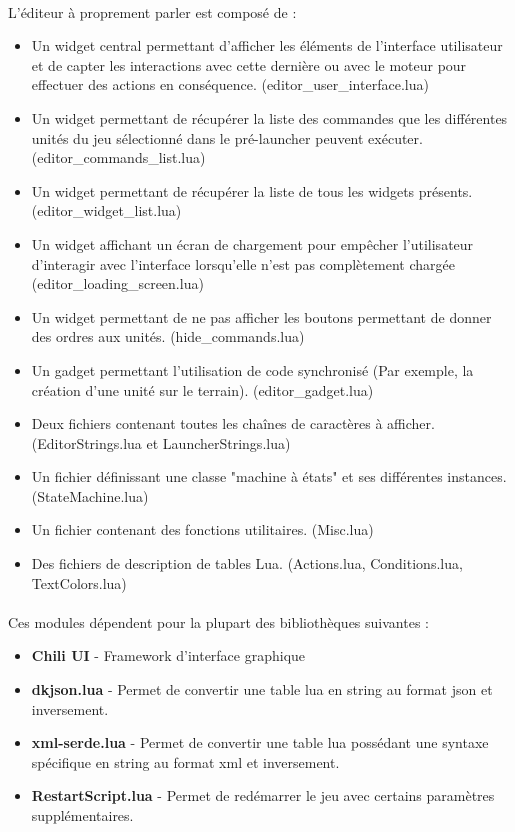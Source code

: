 \documentclass[a4paper]{article}
\begin{document}
\paragraph{}
L'éditeur à proprement parler est composé de :
\begin{itemize}
\item Un widget central permettant d'afficher les éléments de l'interface utilisateur et de capter les interactions avec cette dernière ou avec le moteur pour effectuer des actions en conséquence. (editor\_user\_interface.lua)
\item Un widget permettant de récupérer la liste des commandes que les différentes unités du jeu sélectionné dans le pré-launcher peuvent exécuter. (editor\_commands\_list.lua)
\item Un widget permettant de récupérer la liste de tous les widgets présents. (editor\_widget\_list.lua)
\item Un widget affichant un écran de chargement pour empêcher l'utilisateur d'interagir avec l'interface lorsqu'elle n'est pas complètement chargée (editor\_loading\_screen.lua)
\item Un widget permettant de ne pas afficher les boutons permettant de donner des ordres aux unités. (hide\_commands.lua)
\item Un gadget permettant l'utilisation de code synchronisé (Par exemple, la création d'une unité sur le terrain). (editor\_gadget.lua)
\item Deux fichiers contenant toutes les chaînes de caractères à afficher. (EditorStrings.lua et LauncherStrings.lua)
\item Un fichier définissant une classe "machine à états" et ses différentes instances. (StateMachine.lua)
\item Un fichier contenant des fonctions utilitaires. (Misc.lua)
\item Des fichiers de description de tables Lua. (Actions.lua, Conditions.lua, TextColors.lua)
\end{itemize}
\paragraph{}
Ces modules dépendent pour la plupart des bibliothèques suivantes :
\begin{itemize}
\item \textbf{Chili UI} - Framework d'interface graphique
\item \textbf{dkjson.lua} - Permet de convertir une table lua en string au format json et inversement.
\item \textbf{xml-serde.lua} - Permet de convertir une table lua possédant une syntaxe spécifique en string au format xml et inversement.
\item \textbf{RestartScript.lua} - Permet de redémarrer le jeu avec certains paramètres supplémentaires.
\end{itemize}
\end{document}
